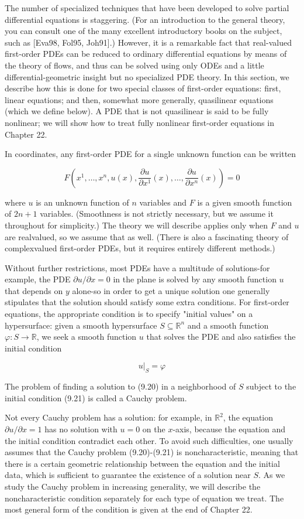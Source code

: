 \documentclass[10pt]{article}
\begin{document}
The number of specialized techniques that have been developed to solve partial differential equations is staggering. (For an introduction to the general theory, you can consult one of the many excellent introductory books on the subject, such as [Eva98, Fol95, Joh91].) However, it is a remarkable fact that real-valued first-order PDEs can be reduced to ordinary differential equations by means of the theory of flows, and thus can be solved using only ODEs and a little differential-geometric insight but no specialized PDE theory. In this section, we describe how this is done for two special classes of first-order equations: first, linear equations; and then, somewhat more generally, quasilinear equations (which we define below). A PDE that is not quasilinear is said to be fully nonlinear; we will show how to treat fully nonlinear first-order equations in Chapter 22.

In coordinates, any first-order PDE for a single unknown function can be written

$$
F\left(x^{1}, \ldots, x^{n}, u(x), \frac{\partial u}{\partial x^{1}}(x), \ldots, \frac{\partial u}{\partial x^{n}}(x)\right)=0
$$

where $u$ is an unknown function of $n$ variables and $F$ is a given smooth function of $2 n+1$ variables. (Smoothness is not strictly necessary, but we assume it throughout for simplicity.) The theory we will describe applies only when $F$ and $u$ are realvalued, so we assume that as well. (There is also a fascinating theory of complexvalued first-order PDEs, but it requires entirely different methods.)

Without further restrictions, most PDEs have a multitude of solutions-for example, the PDE $\partial u / \partial x=0$ in the plane is solved by any smooth function $u$ that depends on $y$ alone-so in order to get a unique solution one generally stipulates that the solution should satisfy some extra conditions. For first-order equations, the appropriate condition is to specify "initial values" on a hypersurface: given a smooth hypersurface $S \subseteq \mathbb{R}^{n}$ and a smooth function $\varphi: S \rightarrow \mathbb{R}$, we seek a smooth function $u$ that solves the PDE and also satisfies the initial condition

$$
\left.u\right|_{S}=\varphi
$$

The problem of finding a solution to (9.20) in a neighborhood of $S$ subject to the initial condition (9.21) is called a Cauchy problem.

Not every Cauchy problem has a solution: for example, in $\mathbb{R}^{2}$, the equation $\partial u / \partial x=1$ has no solution with $u=0$ on the $x$-axis, because the equation and the initial condition contradict each other. To avoid such difficulties, one usually assumes that the Cauchy problem (9.20)-(9.21) is noncharacteristic, meaning that there is a certain geometric relationship between the equation and the initial data, which is sufficient to guarantee the existence of a solution near $S$. As we study the Cauchy problem in increasing generality, we will describe the noncharacteristic condition separately for each type of equation we treat. The most general form of the condition is given at the end of Chapter 22.
\end{document}
